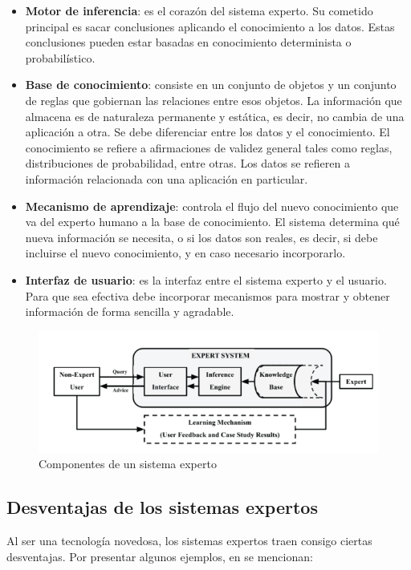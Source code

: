 \begin{itemize}
\item \textbf{Motor de inferencia}: es el corazón del sistema experto. Su cometido principal es sacar conclusiones aplicando el conocimiento a los datos. Estas conclusiones pueden estar basadas en conocimiento determinista o probabilístico.
\item \textbf{Base de conocimiento}: consiste en un conjunto de objetos y un conjunto de reglas que gobiernan las relaciones entre esos objetos. La información que almacena es de naturaleza permanente y estática, es decir, no cambia de una aplicación a otra. Se debe diferenciar entre los datos y el conocimiento. El conocimiento se refiere a afirmaciones de validez general tales como reglas, distribuciones de probabilidad, entre otras. Los datos se refieren a información relacionada con una aplicación en particular.
\item \textbf{Mecanismo de aprendizaje}: controla el flujo del nuevo conocimiento que va del experto humano a la base de conocimiento. El sistema determina qué nueva información se necesita, o si los datos son reales, es decir, si debe incluirse el nuevo conocimiento, y en caso necesario incorporarlo.
\item \textbf{Interfaz de usuario}: es la interfaz entre el sistema experto y el usuario. Para que sea efectiva debe incorporar mecanismos para mostrar y obtener información de forma sencilla y agradable.
\end{itemize}

\begin{figure}[h]
\centering
 \includegraphics[width=0.7\linewidth]{imagen/componentes.png}
 \caption{Componentes de un sistema experto}
 \label{fig:componentes} 
\end{figure}

\subsection{Desventajas de los sistemas expertos}
Al ser una tecnología novedosa, los sistemas expertos traen consigo ciertas desventajas. Por presentar algunos ejemplos, en \cite{Kandula2020} se mencionan:

